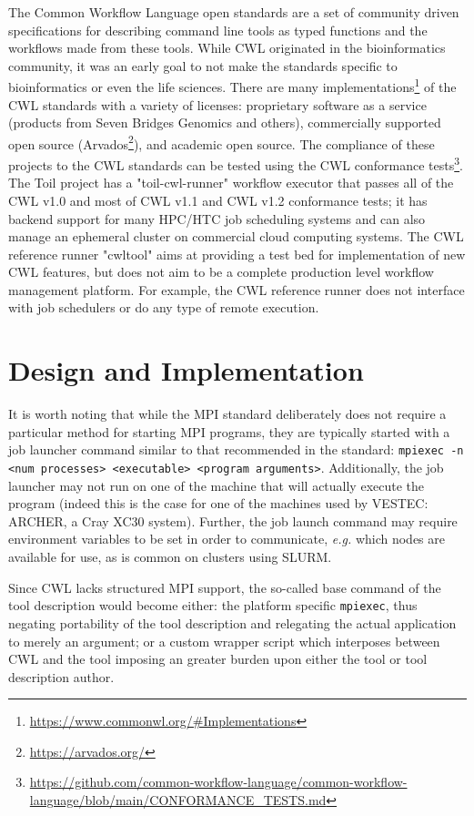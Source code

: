 \documentclass[conference]{IEEEtran}
\begin{document}
The Common Workflow Language open standards\cite{cwl10} are a set of community driven specifications for describing command line tools as typed functions and the workflows made from these tools. While CWL originated in the bioinformatics community, it was an early goal to not make the standards specific to bioinformatics or even the life sciences. There are many implementations\footnote{\url{https://www.commonwl.org/#Implementations}} of the CWL standards with a variety of licenses: proprietary software as a service (products from Seven Bridges Genomics and others), commercially supported open source (Arvados\footnote{\url{https://arvados.org/}}), and academic open source. The compliance of these projects to the CWL standards can be tested using the CWL conformance tests\footnote{\url{https://github.com/common-workflow-language/common-workflow-language/blob/main/CONFORMANCE_TESTS.md}}. The Toil\cite{toil} project has a "toil-cwl-runner" workflow executor that passes all of the CWL v1.0 and most of CWL v1.1 and CWL v1.2 conformance tests; it has backend support for many HPC/HTC job scheduling systems and can also manage an ephemeral cluster on commercial cloud computing systems. The CWL reference runner "cwltool" aims at providing a test bed for implementation of new CWL features, but does not aim to be a complete production level workflow management platform. For example, the CWL reference runner does not interface with job schedulers or do any type of remote execution.

\section{Design and Implementation}
\label{sec:imp}
It is worth noting that while the MPI standard deliberately does not require a particular method for starting MPI programs, they are typically started with a job launcher command similar to that recommended in the standard: \texttt{mpiexec -n <num processes> <executable> <program arguments>}. Additionally, the job launcher may not run on one of the machine that will actually execute the program (indeed this is the case for one of the machines used by VESTEC: ARCHER, a Cray XC30 system). Further, the job launch command may require environment variables to be set in order to communicate, \emph{e.g.} which nodes are available for use, as is common on clusters using SLURM.

Since CWL lacks structured MPI support, the so-called base command of the tool description would become either: the platform specific \verb`mpiexec`, thus negating portability of the tool description and relegating the actual application to merely an argument; or a custom wrapper script which interposes between CWL and the tool imposing an greater burden upon either the tool or tool description author.
\end{document}
